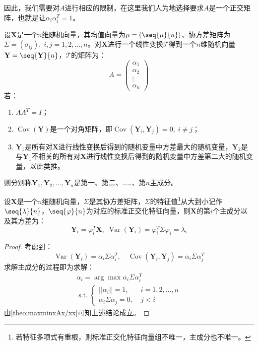 因此，我们需要对$A$进行相应的限制，在这里我们人为地选择要求$A$是一个正交矩阵，也就是让$\alpha_i\alpha_i^T=1$。
\begin{definition}
	设$\mathbf{X}$是一个$n$维随机向量，其均值向量为$\mu=(\seq{\mu}{n})$、协方差矩阵为$\Sigma=(\sigma_{ij}),\;i,j=1,2,\dots,n$。对$\mathbf{X}$进行一个线性变换$\mathcal{T}$得到一个$n$维随机向量$\mathbf{Y}=\seq{\mathbf{Y}}{n}$，$\mathcal{T}$的矩阵为：
	\begin{equation*}
		A=
		\begin{pmatrix}
			\alpha_1 \\
			\alpha_2 \\
			\vdots \\
			\alpha_n
		\end{pmatrix}
	\end{equation*}
	若：
	\begin{enumerate}
		\item $AA^T=I$；
		\item $\operatorname{Cov}(\mathbf{Y})$是一个对角矩阵，即$\operatorname{Cov}(\mathbf{Y}_i,\mathbf{Y}_j)=0,\;i\ne j$；
		\item $\mathbf{Y}_1$是所有对$\mathbf{X}$进行线性变换后得到的随机变量中方差最大的随机变量，$\mathbf{Y}_2$是与$\mathbf{Y}_1$不相关的所有对$\mathbf{X}$进行线性变换后得到的随机变量中方差第二大的随机变量，以此类推。
	\end{enumerate}
	则分别称$\mathbf{Y}_1,\mathbf{Y}_2,\dots,\mathbf{Y}_n$是第一、第二、……、第$n$主成分。
\end{definition}
\begin{theorem}\label{theo:PCA}
	设$\mathbf{X}$是一个$n$维随机向量，$\Sigma$是其协方差矩阵，$\Sigma$的特征值\footnote{若特征多项式有重根，则标准正交化特征向量组不唯一，主成分也不唯一。}从大到小记作$\seq{\lambda}{n}$，$\seq{\varphi}{n}$为对应的标准正交化特征向量，则$\mathbf{X}$的第$i$个主成分以及其方差为：
	\begin{equation*}
		\mathbf{Y}_i=\varphi_i^T\mathbf{X},\;\operatorname{Var}(\mathbf{Y}_i)=\varphi_i^T\Sigma\varphi_i=\lambda_i
	\end{equation*}
\end{theorem}
\begin{proof}
	考虑到：
	\begin{equation*}
		\operatorname{Var}(\mathbf{Y}_i)=\alpha_i\Sigma\alpha_i^T,\quad
		\operatorname{Cov}(\mathbf{Y}_i,\mathbf{Y}_j)=\alpha_i\Sigma\alpha_j^T
	\end{equation*}
	求解主成分的过程即为求解：
	\begin{gather*}
		\alpha_i=\arg\max\alpha_i\Sigma\alpha_i^T \\
		\operatorname{s.t.}
		\begin{cases}
			||\alpha_i||=1,\;&i=1,2,\dots,n\\
			\alpha_i\Sigma\alpha_j=0,\;&j<i
		\end{cases}
	\end{gather*}
	由\cref{theo:maxminxAx/xx}可知上述结论成立。
\end{proof}
